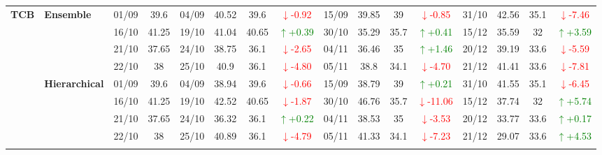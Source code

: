 {\begin{longtable}{llcc|cccc|cccc|cccc}
\multirow{12}{*}{\textbf{TCB}} 
& \textbf{Ensemble}
& 01/09 & 39.6 & 04/09 & 40.52 & 39.6 & \textcolor{red}{\(\downarrow\)-0.92} & 15/09 & 39.85 & 39 & \textcolor{red}{\(\downarrow\)-0.85} & 31/10 & 42.56 & 35.1 & \textcolor{red}{\(\downarrow\)-7.46} \\

&
& 16/10 & 41.25 & 19/10 & 41.04 & 40.65 & \textcolor{green}{\(\uparrow\)+0.39} & 30/10 & 35.29 & 35.7 & \textcolor{green}{\(\uparrow\)+0.41} & 15/12 & 35.59 & 32 & \textcolor{green}{\(\uparrow\)+3.59} \\

&
& 21/10 & 37.65 & 24/10 & 38.75 & 36.1 & \textcolor{red}{\(\downarrow\)-2.65} & 04/11 & 36.46 & 35 & \textcolor{green}{\(\uparrow\)+1.46} & 20/12 & 39.19 & 33.6 & \textcolor{red}{\(\downarrow\)-5.59} \\

&
& 22/10 & 38 & 25/10 & 40.9 & 36.1 & \textcolor{red}{\(\downarrow\)-4.80} & 05/11 & 38.8 & 34.1 & \textcolor{red}{\(\downarrow\)-4.70} & 21/12 & 41.41 & 33.6 & \textcolor{red}{\(\downarrow\)-7.81} \\
\cmidrule(lr){2-16}


& \textbf{Hierarchical}
& 01/09 & 39.6 & 04/09 & 38.94 & 39.6 & \textcolor{red}{\(\downarrow\)-0.66} & 15/09 & 38.79 & 39 & \textcolor{green}{\(\uparrow\)+0.21} & 31/10 & 41.55 & 35.1 & \textcolor{red}{\(\downarrow\)-6.45} \\

&
& 16/10 & 41.25 & 19/10 & 42.52 & 40.65 & \textcolor{red}{\(\downarrow\)-1.87} & 30/10 & 46.76 & 35.7 & \textcolor{red}{\(\downarrow\)-11.06} & 15/12 & 37.74 & 32 & \textcolor{green}{\(\uparrow\)+5.74} \\

&
& 21/10 & 37.65 & 24/10 & 36.32 & 36.1 & \textcolor{green}{\(\uparrow\)+0.22} & 04/11 & 38.53 & 35 & \textcolor{red}{\(\downarrow\)-3.53} & 20/12 & 33.77 & 33.6 & \textcolor{green}{\(\uparrow\)+0.17} \\

&
& 22/10 & 38 & 25/10 & 40.89 & 36.1 & \textcolor{red}{\(\downarrow\)-4.79} & 05/11 & 41.33 & 34.1 & \textcolor{red}{\(\downarrow\)-7.23} & 21/12 & 29.07 & 33.6 & \textcolor{green}{\(\uparrow\)+4.53} \\
\cmidrule(lr){2-16}




\end{longtable}}
